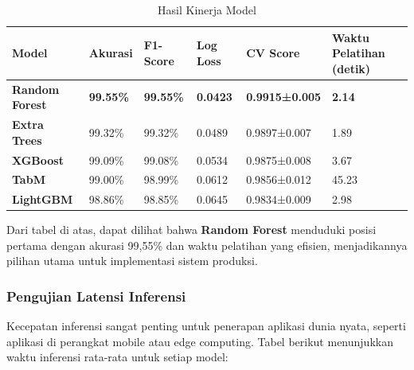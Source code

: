 \documentclass{article} %
\begin{document}
\begin{table}[h!]
\centering
\begin{tabular}{|l|l|l|l|l|l|}
\hline
\textbf{Model}          & \textbf{Akurasi} & \textbf{F1-Score} & \textbf{Log Loss} & \textbf{CV Score} & \textbf{Waktu Pelatihan (detik)} \\ \hline
\textbf{Random Forest}  & \textbf{99.55\%}  & \textbf{99.55\%}   & \textbf{0.0423}   & \textbf{0.9915±0.005} & \textbf{2.14}  \\ \hline
\textbf{Extra Trees}    & 99.32\%           & 99.32\%            & 0.0489            & 0.9897±0.007        & 1.89           \\ \hline
\textbf{XGBoost}        & 99.09\%           & 99.08\%            & 0.0534            & 0.9875±0.008        & 3.67           \\ \hline
\textbf{TabM}           & 99.00\%           & 98.99\%            & 0.0612            & 0.9856±0.012        & 45.23          \\ \hline
\textbf{LightGBM}       & 98.86\%           & 98.85\%            & 0.0645            & 0.9834±0.009        & 2.98           \\ \hline
\end{tabular}
\caption{Hasil Kinerja Model}
\end{table}

Dari tabel di atas, dapat dilihat bahwa \textbf{Random Forest} menduduki posisi pertama dengan akurasi 99,55\% dan waktu pelatihan yang efisien, menjadikannya pilihan utama untuk implementasi sistem produksi.

\subsubsection{Pengujian Latensi Inferensi}

Kecepatan inferensi sangat penting untuk penerapan aplikasi dunia nyata, seperti aplikasi di perangkat mobile atau edge computing. Tabel berikut menunjukkan waktu inferensi rata-rata untuk setiap model:
\end{document}
